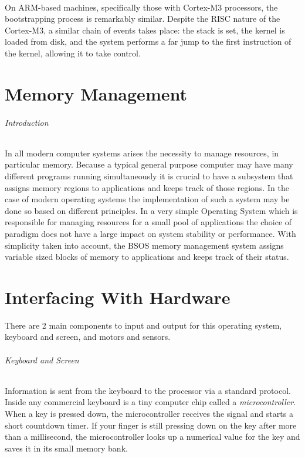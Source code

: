 \documentclass[english]{paper}
\begin{document}
\paragraph{}
On ARM-based machines, specifically those with Cortex-M3 processors, the bootstrapping process is remarkably similar. Despite the RISC nature of the Cortex-M3, a similar chain of events takes place: the stack is set, the kernel is loaded from disk, and the system performs a far jump to the first instruction of the kernel, allowing it to take control.

\part{Memory Management}

\paragraph{Introduction}
In all modern computer systems arises the necessity to manage resources, in particular memory. Because a typical general purpose computer
may have many different programs running simultaneously it is crucial to have a subsystem that assigns memory regions to applications and keeps
track of those regions. In the case of modern operating systems the implementation of such a system may be done so based on different principles.
In a very simple Operating System which is responsible for managing resources for a small pool of applications the choice of paradigm does not have a large impact on system stability or performance.
With simplicity taken into account, the BSOS memory management system assigns variable sized blocks of memory to applications and keeps track of their status.


\part{Interfacing With Hardware}
There are 2 main components to input and output for this operating system, keyboard and screen, and motors and sensors.
\paragraph{Keyboard and Screen}
Information is sent from the keyboard to the processor via a standard protocol. Inside any commercial keyboard is a tiny computer chip
called a {\it microcontroller}. When a key is pressed down, the microcontroller receives the signal and starts a short countdown timer. If your finger is still pressing down on the key after more than a millisecond, the microcontroller looks up a numerical value for the key
and saves it in its small memory bank.
\end{document}
